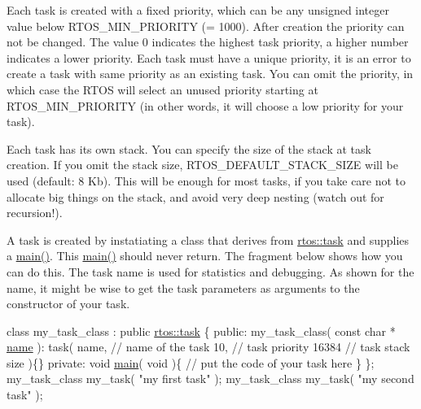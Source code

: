 Each task is created with a fixed priority, which can be any unsigned integer value below R\+T\+O\+S\+\_\+\+M\+I\+N\+\_\+\+P\+R\+I\+O\+R\+I\+TY (= 1000). After creation the priority can not be changed. The value 0 indicates the highest task priority, a higher number indicates a lower priority. Each task must have a unique priority, it is an error to create a task with same priority as an existing task. You can omit the priority, in which case the R\+T\+OS will select an unused priority starting at R\+T\+O\+S\+\_\+\+M\+I\+N\+\_\+\+P\+R\+I\+O\+R\+I\+TY (in other words, it will choose a low priority for your task).

Each task has its own stack. You can specify the size of the stack at task creation. If you omit the stack size, R\+T\+O\+S\+\_\+\+D\+E\+F\+A\+U\+L\+T\+\_\+\+S\+T\+A\+C\+K\+\_\+\+S\+I\+ZE will be used (default\+: 8 Kb). This will be enough for most tasks, if you take care not to allocate big things on the stack, and avoid very deep nesting (watch out for recursion!).

A task is created by instatiating a class that derives from \hyperlink{classrtos_1_1task}{rtos\+::task} and supplies a \hyperlink{classrtos_1_1task__base_a35016dfecdd20ce4786ef7a16154976a}{main()}. This \hyperlink{classrtos_1_1task__base_a35016dfecdd20ce4786ef7a16154976a}{main()} should never return. The fragment below shows how you can do this. The task name is used for statistics and debugging. As shown for the name, it might be wise to get the task parameters as arguments to the constructor of your task.


\begin{DoxyCode}
\textcolor{keyword}{class }my\_task\_class : \textcolor{keyword}{public} \hyperlink{classrtos_1_1task}{rtos::task} \{
\textcolor{keyword}{public}:
   my\_task\_class( \textcolor{keyword}{const} \textcolor{keywordtype}{char} * \hyperlink{classrtos_1_1task__base_ad6469d5653e3021769e4fa89c20920bf}{name} ):
      task(
         name,  \textcolor{comment}{// name of the task}
         10,    \textcolor{comment}{// task priority}
         16384  \textcolor{comment}{// task stack size}
      )\{\}
\textcolor{keyword}{private}:
   \textcolor{keywordtype}{void} \hyperlink{classrtos_1_1task__base_a35016dfecdd20ce4786ef7a16154976a}{main}( \textcolor{keywordtype}{void} )\{
      \textcolor{comment}{// put the code of your task here}
   \}
\};
my\_task\_class my\_task( \textcolor{stringliteral}{"my first task"} );
my\_task\_class my\_task( \textcolor{stringliteral}{"my second task"} );
\end{DoxyCode}


